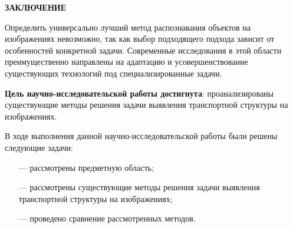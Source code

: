 \begin{center}
    \textbf{ЗАКЛЮЧЕНИЕ}
\end{center}

Определить универсально лучший метод распознавания объектов на изображениях невозможно, так как выбор подходящего подхода зависит от особенностей конкретной задачи. Современные исследования в этой области преимущественно направлены на адаптацию и усовершенствование существующих технологий под специализированные задачи.

\textbf{Цель научно-исследовательской работы достигнута}: проанализированы существующие методы решения задачи выявления транспортной структуры на изображениях.

В ходе выполнения данной научно-исследовательской  работы были решены следующие задачи:

\begin{itemize}
    \item[---] рассмотрены предметную область;
    \item[---] рассмотрены существующие методы решения задачи выявления транспортной структуры на изображениях;
    \item[---] проведено сравнение рассмотренных методов.
\end{itemize}


\clearpage